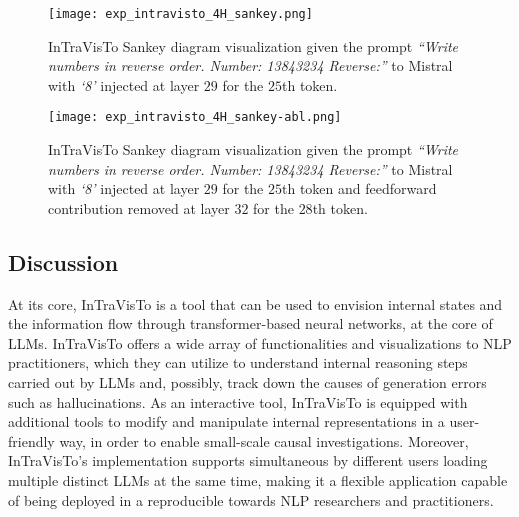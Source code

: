 \begin{figure}[t!]
    \centering
    \texttt{[image: exp\_intravisto\_4H\_sankey.png]}
    \caption[InTraVisTo Sankey diagram visualization given the prompt \emph{``Write numbers in reverse order. Number: 13843234 Reverse:''} to Mistral with injection.]{InTraVisTo Sankey diagram visualization given the prompt \emph{``Write numbers in reverse order. Number: 13843234 Reverse:''} to Mistral with \emph{`8'} injected at layer $29$ for the $25$th token.}
    \label{fig:exp_intravisto_4_H1}
\end{figure}
\begin{figure}[t!]
    \centering
    \texttt{[image: exp\_intravisto\_4H\_sankey-abl.png]}
    \caption[InTraVisTo Sankey diagram visualization given the prompt \emph{``Write numbers in reverse order. Number: 13843234 Reverse:''} to Mistral with injection and ablation.]{InTraVisTo Sankey diagram visualization given the prompt \emph{``Write numbers in reverse order. Number: 13843234 Reverse:''} to Mistral with \emph{`8'} injected at layer $29$ for the $25$th token and feedforward contribution removed at layer $32$ for the $28$th token.}
    \label{fig:exp_intravisto_4_H2}
\end{figure}

\subsection{Discussion}

At its core, InTraVisTo is a tool that can be used to envision internal states and the information flow through transformer-based neural networks, at the core of LLMs.
InTraVisTo offers a wide array of functionalities and visualizations to NLP practitioners, which they can utilize to understand internal reasoning steps carried out by LLMs and, possibly, track down the causes of generation errors such as hallucinations.
As an interactive tool, InTraVisTo is equipped with additional tools to modify and manipulate internal representations in a user-friendly way, in order to enable small-scale causal investigations.
Moreover, InTraVisTo's implementation supports simultaneous  by different users loading multiple distinct LLMs at the same time, making it a flexible application capable of being deployed in a reproducible   towards NLP researchers and practitioners.

